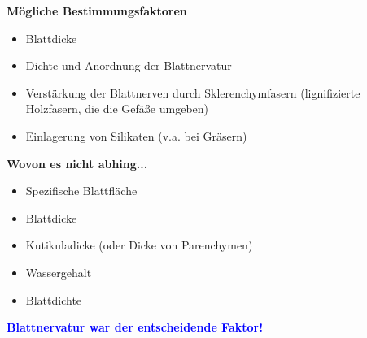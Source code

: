 \newpage
\textbf{Mögliche Bestimmungsfaktoren}
\begin{itemize}
	\item Blattdicke
	\item Dichte und Anordnung der Blattnervatur
	\item Verstärkung der Blattnerven durch Sklerenchymfasern (lignifizierte Holzfasern, die die Gefäße umgeben)
	\item Einlagerung von Silikaten (v.a. bei Gräsern)
\end{itemize}

\textbf{Wovon es nicht abhing...}
\begin{itemize}
	\item Spezifische Blattfläche
	\item Blattdicke
	\item Kutikuladicke (oder Dicke von Parenchymen)
	\item Wassergehalt
	\item Blattdichte
\end{itemize}

\textcolor{blue}{\textbf{Blattnervatur war der entscheidende Faktor!}}